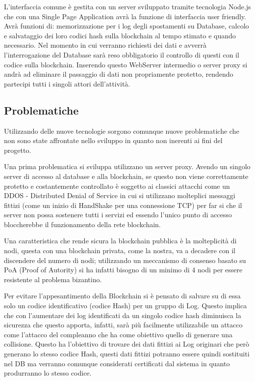 \documentclass[11pt,a4paper,titlepage]{report}
\begin{document}
L'interfaccia comune è gestita con un server sviluppato tramite tecnologia Node.js che con una Single Page Application avrà la funzione di interfaccia user friendly. Avrà funzioni di: memorizzazione per i log degli spostamenti su Database, calcolo e salvataggio dei loro codici hash sulla blockchain al tempo stimato e quando necessario. Nel momento in cui verranno richiesti dei dati e avverrà l'interrogazione del Database sarà reso obbligatorio il controllo di questi con il codice sulla blockchain. Inserendo questo WebServer intermedio o server proxy si andrà ad eliminare il passaggio di dati non propriamente protetto, rendendo partecipi tutti i singoli attori dell'attività.

\subsection{Problematiche}
Utilizzando delle nuove tecnologie sorgono comunque nuove problematiche che non sono state affrontate nello sviluppo in quanto non inerenti ai fini del progetto.

Una prima problematica si sviluppa utilizzano un server proxy. Avendo un singolo server di accesso al database e alla blockchain, se questo non viene correttamente protetto e costantemente controllato è soggetto ai classici attacchi come un DDOS - Distributed Denial of Service in cui si utilizzano molteplici messaggi fittizi (come un inizio di HandShake per una connessione TCP) per far si che il server non possa sostenere tutti i servizi ed essendo l'unico punto di accesso bloccherebbe il funzionamento della rete blockchain.

Una caratteristica che rende sicura la blockchain pubblica è la molteplicità di nodi, questa con una blockchain privata, come la nostra, va a decadere con il discendere  del numero di nodi; utilizzando un meccanismo di consenso basato su PoA (Proof of Autority) si ha infatti bisogno di un minimo di 4 nodi per essere resistente al problema bizantino.

Per evitare l'appesantimento della Blockchain si è pensato di salvare su di essa solo un codice identificativo (codice Hash) per un gruppo di Log. Questo implica che con l'aumentare dei log identificati da un singolo codice hash diminuisca la sicurezza che questo apporta, infatti, sarà più facilmente utilizzabile un attacco come l'attacco del compleanno che ha come obiettivo quello di generare una collisione. Questo ha l'obiettivo di trovare dei dati fittizi ai Log originari che però generano lo stesso codice Hash, questi dati fittizi potranno essere quindi sostituiti nel DB ma verranno comunque considerati certificati dal sistema in quanto produrranno lo stesso codice.
\end{document}
